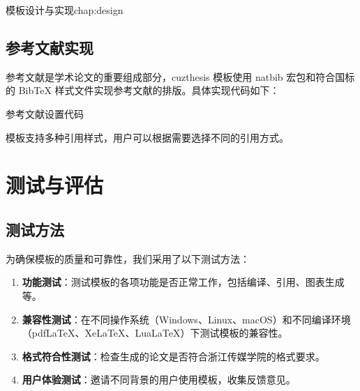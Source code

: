 \begin{cuzchapter}{模板设计与实现}{chap:design}
    \subsection{参考文献实现}

    参考文献是学术论文的重要组成部分，cuzthesis 模板使用 natbib 宏包和符合国标的 BibTeX 样式文件实现参考文献的排版。具体实现代码如下：

    \begin{listing}[htbp]
        \caption{参考文献设置代码}
        \label{code:bibliography}
        \begin{texcode}

            \setlength{\bibsep}{0.5ex}
            \renewcommand{\bibfont}{\small}
        \end{texcode}
    \end{listing}

    模板支持多种引用样式，用户可以根据需要选择不同的引用方式。

    \section{测试与评估}\label{sec:testing-evaluation}

    \subsection{测试方法}

    为确保模板的质量和可靠性，我们采用了以下测试方法：

    \begin{enumerate}
        \item \textbf{功能测试}：测试模板的各项功能是否正常工作，包括编译、引用、图表生成等。

        \item \textbf{兼容性测试}：在不同操作系统（Windows、Linux、macOS）和不同编译环境（pdfLaTeX、XeLaTeX、LuaLaTeX）下测试模板的兼容性。

        \item \textbf{格式符合性测试}：检查生成的论文是否符合浙江传媒学院的格式要求。

        \item \textbf{用户体验测试}：邀请不同背景的用户使用模板，收集反馈意见。
    \end{enumerate}


\end{cuzchapter}
